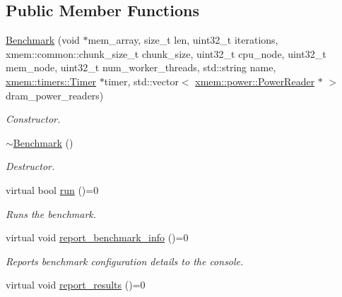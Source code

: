 \subsection*{Public Member Functions}
\begin{DoxyCompactItemize}
\item 
\hyperlink{classxmem_1_1benchmark_1_1_benchmark_a6eda9023866fc80e334d7d8d2a220817}{Benchmark} (void $\ast$mem\+\_\+array, size\+\_\+t len, uint32\+\_\+t iterations, xmem\+::common\+::chunk\+\_\+size\+\_\+t chunk\+\_\+size, uint32\+\_\+t cpu\+\_\+node, uint32\+\_\+t mem\+\_\+node, uint32\+\_\+t num\+\_\+worker\+\_\+threads, std\+::string name, \hyperlink{classxmem_1_1timers_1_1_timer}{xmem\+::timers\+::\+Timer} $\ast$timer, std\+::vector$<$ \hyperlink{classxmem_1_1power_1_1_power_reader}{xmem\+::power\+::\+Power\+Reader} $\ast$ $>$ dram\+\_\+power\+\_\+readers)
\begin{DoxyCompactList}\small\item\em Constructor. \end{DoxyCompactList}\item 
\hypertarget{classxmem_1_1benchmark_1_1_benchmark_a20476e07f09e2b20ed3e9a7f13a570e6}{}\hyperlink{classxmem_1_1benchmark_1_1_benchmark_a20476e07f09e2b20ed3e9a7f13a570e6}{$\sim$\+Benchmark} ()\label{classxmem_1_1benchmark_1_1_benchmark_a20476e07f09e2b20ed3e9a7f13a570e6}

\begin{DoxyCompactList}\small\item\em Destructor. \end{DoxyCompactList}\item 
virtual bool \hyperlink{classxmem_1_1benchmark_1_1_benchmark_aa0dbe60e525457770c835c6c72a0be6a}{run} ()=0
\begin{DoxyCompactList}\small\item\em Runs the benchmark. \end{DoxyCompactList}\item 
\hypertarget{classxmem_1_1benchmark_1_1_benchmark_ae788ccb9d65f543b1bc59f963ec5f2e2}{}virtual void \hyperlink{classxmem_1_1benchmark_1_1_benchmark_ae788ccb9d65f543b1bc59f963ec5f2e2}{report\+\_\+benchmark\+\_\+info} ()=0\label{classxmem_1_1benchmark_1_1_benchmark_ae788ccb9d65f543b1bc59f963ec5f2e2}

\begin{DoxyCompactList}\small\item\em Reports benchmark configuration details to the console. \end{DoxyCompactList}\item 
\hypertarget{classxmem_1_1benchmark_1_1_benchmark_ad9b74db44f972909dcba85dd32cef0a3}{}virtual void \hyperlink{classxmem_1_1benchmark_1_1_benchmark_ad9b74db44f972909dcba85dd32cef0a3}{report\+\_\+results} ()=0\label{classxmem_1_1benchmark_1_1_benchmark_ad9b74db44f972909dcba85dd32cef0a3}


\end{DoxyCompactItemize}
